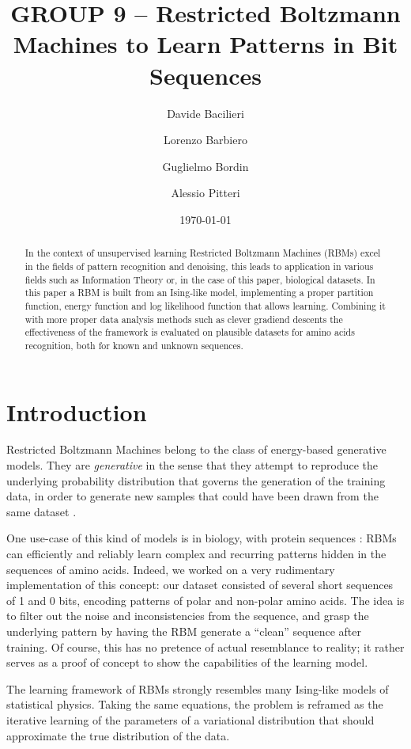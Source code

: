 \documentclass[prl, twocolumn]{revtex4-2}
\begin{document}
\title{GROUP 9 -- Restricted Boltzmann Machines to Learn Patterns in Bit Sequences}
\author{Davide Bacilieri}
\author{Lorenzo Barbiero}
\author{Guglielmo Bordin}
\author{Alessio Pitteri}
\date{\today}

\begin{abstract}
In the context of unsupervised learning Restricted Boltzmann Machines
(RBMs) excel in the fields of pattern recognition and denoising, this leads
to application in various fields such as Information Theory or, in the case
of this paper, biological datasets.  In this paper a RBM is built from an
Ising-like model, implementing a proper partition function, energy function
and log likelihood function that allows learning. Combining it with more
proper data analysis methods such as clever gradiend descents the
effectiveness of the framework is evaluated on plausible datasets for amino
acids recognition, both for known and unknown sequences.
\end{abstract}

\maketitle

\section{Introduction}
Restricted Boltzmann Machines belong to the class of energy-based
generative models. They are \emph{generative} in the sense that they
attempt to reproduce the underlying probability distribution that governs
the generation of the training data, in order to generate new samples that
could have been drawn from the same dataset \cite{Mehta2019}.

One use-case of this kind of models is in biology, with protein sequences
\cite{Tubiana2019, Tubiana2019_b}: RBMs can efficiently and reliably learn
complex and recurring patterns hidden in the sequences of amino acids.
Indeed, we worked on a very rudimentary implementation of this concept: our
dataset consisted of several short sequences of 1 and 0 bits, encoding
patterns of polar and non-polar amino acids. The idea is to filter out the
noise and inconsistencies from the sequence, and grasp the underlying
pattern by having the RBM generate a “clean” sequence after training. Of
course, this has no pretence of actual resemblance to reality; it rather
serves as a proof of concept to show the capabilities of the learning
model.

The learning framework of RBMs strongly resembles many Ising-like models of
statistical physics. Taking the same equations, the problem is reframed as
the iterative learning of the parameters of a variational distribution that
should approximate the true distribution of the data.
\end{document}
